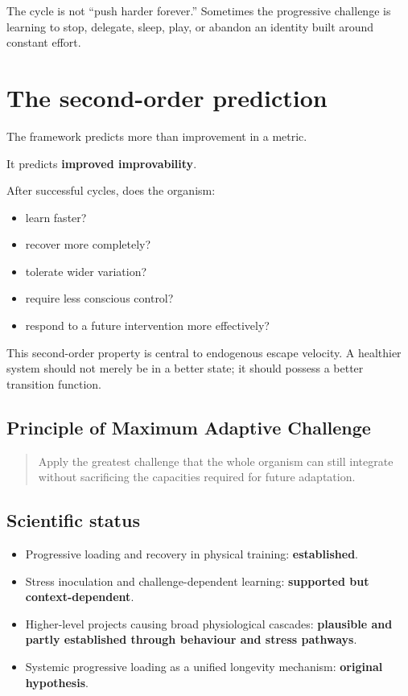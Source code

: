 The cycle is not ``push harder forever.'' Sometimes the progressive challenge is learning to stop, delegate, sleep, play, or abandon an identity built around constant effort.

\section{The second-order prediction}

The framework predicts more than improvement in a metric.

It predicts \textbf{improved improvability}.

After successful cycles, does the organism:

\begin{itemize}
\tightlist
\item
  learn faster?
\item
  recover more completely?
\item
  tolerate wider variation?
\item
  require less conscious control?
\item
  respond to a future intervention more effectively?
\end{itemize}

This second-order property is central to endogenous escape velocity. A healthier system should not merely be in a better state; it should possess a better transition function.

\subsection{Principle of Maximum Adaptive Challenge}

\begin{quote}
Apply the greatest challenge that the whole organism can still integrate without sacrificing the capacities required for future adaptation.
\end{quote}

\subsection{Scientific status}

\begin{itemize}
\tightlist
\item
  Progressive loading and recovery in physical training: \textbf{established}.
\item
  Stress inoculation and challenge-dependent learning: \textbf{supported but context-dependent}.
\item
  Higher-level projects causing broad physiological cascades: \textbf{plausible and partly established through behaviour and stress pathways}.
\item
  Systemic progressive loading as a unified longevity mechanism: \textbf{original hypothesis}.
\end{itemize}
